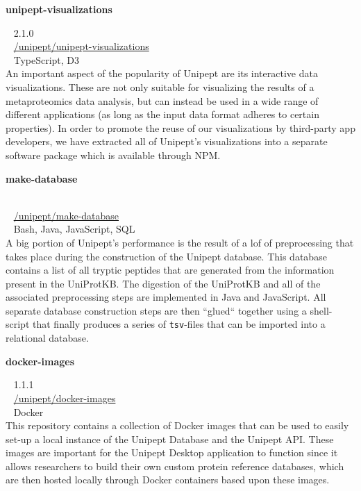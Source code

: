 \begin{large}\textbf{\textsf{unipept-visualizations}}\end{large} \hfill \faTag ~ \textsf{2.1.0} \\
\faGithub ~ \href{https://github.com/unipept/unipept-visualizations}{\textsf{/unipept/unipept-visualizations}} \\
\faCode ~ \textsf{TypeScript, D3} \\
An important aspect of the popularity of Unipept are its interactive data visualizations.
These are not only suitable for visualizing the results of a metaproteomics data analysis, but can instead be used in a wide range of different applications (as long as the input data format adheres to certain properties).
In order to promote the reuse of our visualizations by third-party app developers, we have extracted all of Unipept's visualizations into a separate software package which is available through NPM.

\begin{large}\textbf{\textsf{make-database}}\end{large} \\
\faGithub ~ \href{https://github.com/unipept/make-database}{\textsf{/unipept/make-database}} \\
\faCode ~ \textsf{Bash, Java, JavaScript, SQL} \\
A big portion of Unipept's performance is the result of a lof of preprocessing that takes place during the construction of the Unipept database.
This database contains a list of all tryptic peptides that are generated from the information present in the UniProtKB.
The digestion of the UniProtKB and all of the associated preprocessing steps are implemented in Java and JavaScript.
All separate database construction steps are then ``glued`` together using a shell-script that finally produces a series of \texttt{tsv}-files that can be imported into a relational database.

\begin{large}\textbf{\textsf{docker-images}}\end{large} \hfill \faTag ~ \textsf{1.1.1} \\
\faGithub ~ \href{https://github.com/unipept/docker-images}{\textsf{/unipept/docker-images}} \\
\faCode ~ \textsf{Docker} \\
This repository contains a collection of Docker images that can be used to easily set-up a local instance of the Unipept Database and the Unipept API.
These images are important for the Unipept Desktop application to function since it allows researchers to build their own custom protein reference databases, which are then hosted locally through Docker containers based upon these images.

